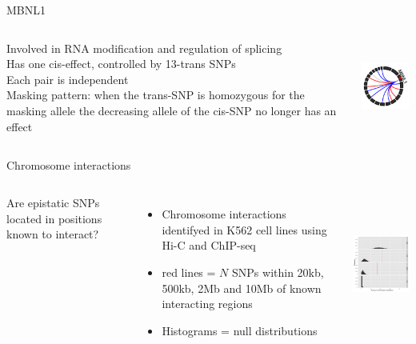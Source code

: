 \documentclass{beamer}
\begin{document}
\begin{frame}{MBNL1}
\begin{columns}[c]
Involved in RNA modification and regulation of splicing \\
\vspace{0.3cm}
Has one cis-effect, controlled by 13-trans SNPs \\   
\vspace{0.3cm}
Each pair is independent \\
\vspace{0.3cm}
Masking pattern: when the trans-SNP is homozygous for the masking allele the decreasing allele of the cis-SNP no longer has an effect
\begin{center}
\includegraphics[height=3.0cm]{images/MBNL1.pdf} \\
\end{center}
\end{columns}
\end{frame}


\begin{frame}{Chromosome interactions}
\begin{columns}[c]
Are epistatic SNPs located in positions known to interact? 
\begin{itemize}
\item Chromosome interactions identifyed in K562 cell lines using Hi-C and ChIP-seq
\item red lines = $N$ SNPs within 20kb, 500kb, 2Mb and 10Mb of known interacting regions
\item Histograms = null distributions
\end{itemize}
\begin{center}
\includegraphics[height=4.5cm]{images/chr_int.pdf} \\
\end{center}
\end{columns}
\end{frame}
\end{document}
